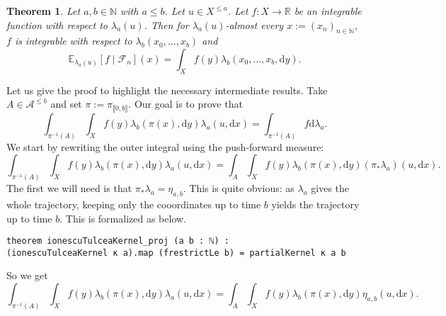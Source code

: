 \documentclass{article}
\newcommand{\E}{\mathbb{E}}
\newcommand{\F}{\mathcal{F}}
\newcommand{\N}{\mathbb{N}}
\newcommand{\R}{\mathbb{R}}
\newcommand{\inv}{^{-1}}
\newcommand{\Xle}[1]{X^{\le#1}}
\newcommand{\Ale}[1]{\mathcal{A}^{\le#1}}
\newcommand{\dx}{\mathrm{d}x}
\newcommand{\dy}{\mathrm{d}y}
\newcommand{\dbrack}[1]{\llbracket #1 \rrbracket}
\newcommand{\dlamb}{\mathrm{d}\lambda}
\newtheorem{thm}{Theorem}[section]
\theoremstyle{definition}
\theoremstyle{remark}
\begin{document}
	\begin{thm}
		\label{thm:condexp}
		Let $a, b \in \N$ with $a \le b$. Let $u \in \Xle{a}$. Let $f : X \to \R$ be an integrable function with respect to $\lambda_a(u)$. Then for $\lambda_a(u)$-almost every $x := (x_n)_{n\in\N}$, $f$ is integrable with respect to $\lambda_b(x_0,...,x_b)$ and
		$$\E_{\lambda_a(u)}[f \mid \F_n] (x) = \int_X f(y) \lambda_b(x_0,...,x_b, \dy).$$
	\end{thm}

	Let us give the proof to highlight the necessary intermediate results. Take $A \in \Ale{b}$ and set $\pi := \pi_{\dbrack{0,b}}$. Our goal is to prove that
	$$\int_{\pi\inv(A)} \int_X f(y) \lambda_b(\pi(x), \dy)\lambda_a(u,\dx) = \int_{\pi\inv(A)} f \dlamb_a.$$
	We start by rewriting the outer integral using the push-forward measure:
	$$\int_{\pi\inv(A)} \int_X f(y) \lambda_b(\pi(x), \dy)\lambda_a(u,\dx) = \int_A \int_X f(y) \lambda_b(\pi(x), \dy)(\pi_*\lambda_a)(u,\dx).$$
	The first we will need is that $\pi_*\lambda_a = \eta_{a,b}$. This is quite obvious: as $\lambda_a$ gives the whole trajectory, keeping only the cooordinates up to time $b$ yields the trajectory up to time $b$. This is formalized as below.
	\begin{lstlisting}
theorem ionescuTulceaKernel_proj (a b : ℕ) :
(ionescuTulceaKernel κ a).map (frestrictLe b) = partialKernel κ a b
	\end{lstlisting}
	So we get $$\int_{\pi\inv(A)} \int_X f(y) \lambda_b(\pi(x), \dy)\lambda_a(u,\dx) = \int_A \int_X f(y) \lambda_b(\pi(x), \dy)\eta_{a,b}(u,\dx).$$
\end{document}
